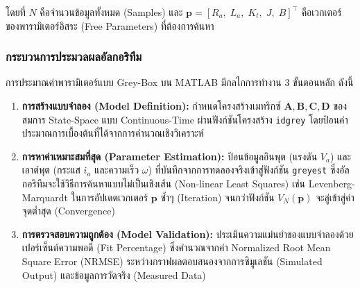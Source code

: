 \noindent โดยที่ $N$ คือจำนวนข้อมูลทั้งหมด (Samples) และ $\mathbf{p} = [R_a,\; L_a,\; K_t,\; J,\; B]^\top$ คือเวกเตอร์ของพารามิเตอร์อิสระ (Free Parameters) ที่ต้องการค้นหา

\subsubsection{กระบวนการประมวลผลอัลกอริทึม}
การประมาณค่าพารามิเตอร์แบบ Grey-Box บน MATLAB มีกลไกการทำงาน 3 ขั้นตอนหลัก ดังนี้
\begin{enumerate}
    \item \textbf{การสร้างแบบจำลอง (Model Definition):} กำหนดโครงสร้างเมทริกซ์ $\mathbf{A}, \mathbf{B}, \mathbf{C}, \mathbf{D}$ ของสมการ State-Space แบบ Continuous-Time ผ่านฟังก์ชันโครงสร้าง \texttt{idgrey} โดยป้อนค่าประมาณการเบื้องต้นที่ได้จากการคำนวณเชิงวิเคราะห์
    \item \textbf{การหาค่าเหมาะสมที่สุด (Parameter Estimation):} ป้อนข้อมูลอินพุต (แรงดัน $V_a$) และเอาต์พุต (กระแส $i_a$ และความเร็ว $\omega$) ที่บันทึกจากการทดลองจริงเข้าสู่ฟังก์ชัน \texttt{greyest} ซึ่งอัลกอริทึมจะใช้วิธีการค้นหาแบบไม่เป็นเชิงเส้น (Non-linear Least Squares) เช่น Levenberg-Marquardt ในการอัปเดตเวกเตอร์ $\mathbf{p}$ ซ้ำๆ (Iteration) จนกว่าฟังก์ชัน $V_N(\mathbf{p})$ จะลู่เข้าสู่ค่าจุดต่ำสุด (Convergence)
    \item \textbf{การตรวจสอบความถูกต้อง (Model Validation):} ประเมินความแม่นยำของแบบจำลองด้วยเปอร์เซ็นต์ความพอดี (Fit Percentage) ซึ่งคำนวณจากค่า Normalized Root Mean Square Error (NRMSE) ระหว่างกราฟผลตอบสนองจากการซิมูเลชัน (Simulated Output) และข้อมูลการวัดจริง (Measured Data)
\end{enumerate}





